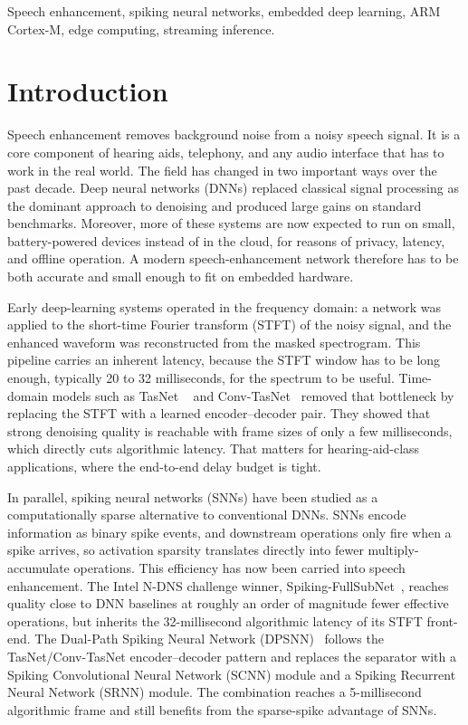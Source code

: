 \documentclass[conference]{IEEEtran}
\begin{document}
\begin{IEEEkeywords}
Speech enhancement, spiking neural networks, embedded deep learning, ARM Cortex-M, edge computing, streaming inference.
\end{IEEEkeywords}


\section{Introduction}
Speech enhancement removes background noise from a noisy speech signal. It is a core component of hearing aids, telephony, and any audio interface that has to work in the real world. The field has changed in two important ways over the past decade. Deep neural networks (DNNs) replaced classical signal processing as the dominant approach to denoising and produced large gains on standard benchmarks. Moreover, more of these systems are now expected to run on small, battery-powered devices instead of in the cloud, for reasons of privacy, latency, and offline operation. A modern speech-enhancement network therefore has to be both accurate and small enough to fit on embedded hardware.

Early deep-learning systems operated in the frequency domain: a network was applied to the short-time Fourier transform (STFT) of the noisy signal, and the enhanced waveform was reconstructed from the masked spectrogram. This pipeline carries an inherent latency, because the STFT window has to be long enough, typically 20 to 32 milliseconds, for the spectrum to be useful. Time-domain models such as TasNet ~\cite{b2} and Conv-TasNet~\cite{b3} removed that bottleneck by replacing the STFT with a learned encoder–decoder pair. They showed that strong denoising quality is reachable with frame sizes of only a few milliseconds, which directly cuts algorithmic latency. That matters for hearing-aid-class applications, where the end-to-end delay budget is tight.

In parallel, spiking neural networks (SNNs) have been studied as a computationally sparse alternative to conventional DNNs. SNNs encode information as binary spike events, and downstream operations only fire when a spike arrives, so activation sparsity translates directly into fewer multiply-accumulate operations. This efficiency has now been carried into speech enhancement. The Intel N-DNS challenge winner, Spiking-FullSubNet~\cite{b1}, reaches quality close to DNN baselines at roughly an order of magnitude fewer effective operations, but inherits the 32-millisecond algorithmic latency of its STFT front-end. The Dual-Path Spiking Neural Network (DPSNN)~\cite{b4} follows the TasNet/Conv-TasNet encoder--decoder pattern and replaces the separator with a Spiking Convolutional Neural Network (SCNN) module and a Spiking Recurrent Neural Network (SRNN) module. The combination reaches a 5-millisecond algorithmic frame and still benefits from the sparse-spike advantage of SNNs.
\end{document}
